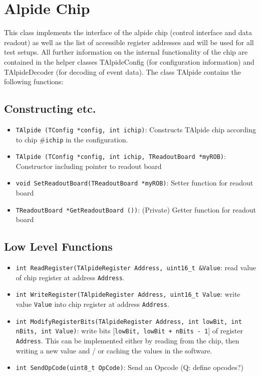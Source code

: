 \documentclass{article}
\let\oldsection\section
\renewcommand\section{\clearpage\oldsection}
\begin{document}
\section {Alpide Chip}
This class implements the interface of the alpide chip (control
interface and data readout) as well as the list of accessible register
addresses and will be used for all test setups. All further
information on the internal functionality of the chip are contained in
the helper classes TAlpideConfig (for configuration information) and
TAlpideDecoder (for decoding of event data). The class TAlpide
contains the following functions: 


\subsection {Constructing etc.}

\begin{itemize}
\item \texttt{TAlpide (TConfig *config, int ichip)}: \newline
  Constructs TAlpide chip according to chip \#\texttt{ichip} in the
  configuration.
\item \texttt{TAlpide (TConfig *config, int ichip, TReadoutBoard *myROB)}: \newline Constructor
  including pointer to readout board
\item \texttt{void SetReadoutBoard(TReadoutBoard *myROB)}: \newline
  Setter function for readout board
\item \texttt{TReadoutBoard *GetReadoutBoard ())}: \newline (Private)
  Getter function for readout board
\end{itemize}


\subsection {Low Level Functions}

\begin{itemize}
\item \texttt{int ReadRegister(TAlpideRegister Address, uint16\_t \&Value}: \newline read value of chip register at address \texttt{Address}.
\item \texttt{int WriteRegister(TAlpideRegister Address, uint16\_t Value}: \newline write value \texttt{Value} into chip register at address
\texttt{Address}.
\item \texttt{int ModifyRegisterBits(TAlpideRegister Address, int
    lowBit, int nBits, int Value)}: write bits [\texttt{lowBit, lowBit + nBits
  - 1}] of register \texttt{Address}. This can be implemented either
by reading from the chip, then writing a new value and / or caching
the values in the software.
\item \texttt{int SendOpCode(uint8\_t OpCode)}: \newline Send an Opcode
  (Q: define opcodes?)
\end{itemize}
\end{document}
